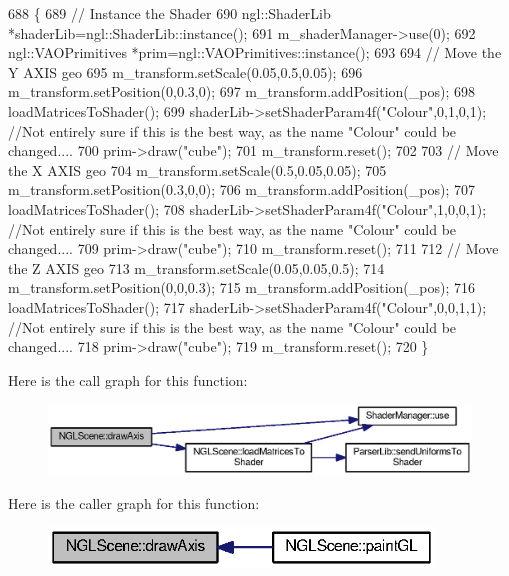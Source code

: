 \begin{DoxyCode}
688 \{
689   \textcolor{comment}{// Instance the Shader}
690   ngl::ShaderLib *shaderLib=ngl::ShaderLib::instance();
691   m_shaderManager->use(0);
692   ngl::VAOPrimitives *prim=ngl::VAOPrimitives::instance();
693 
694   \textcolor{comment}{// Move the Y AXIS geo}
695   m_transform.setScale(0.05,0.5,0.05);
696   m_transform.setPosition(0,0.3,0);
697   m_transform.addPosition(\_pos);
698   loadMatricesToShader();
699   shaderLib->setShaderParam4f(\textcolor{stringliteral}{"Colour"},0,1,0,1); \textcolor{comment}{//Not entirely sure if this is the best way, as the name
       "Colour" could be changed....}
700   prim->draw(\textcolor{stringliteral}{"cube"});
701   m_transform.reset();
702 
703   \textcolor{comment}{// Move the X AXIS geo}
704   m_transform.setScale(0.5,0.05,0.05);
705   m_transform.setPosition(0.3,0,0);
706   m_transform.addPosition(\_pos);
707   loadMatricesToShader();
708   shaderLib->setShaderParam4f(\textcolor{stringliteral}{"Colour"},1,0,0,1); \textcolor{comment}{//Not entirely sure if this is the best way, as the name
       "Colour" could be changed....}
709   prim->draw(\textcolor{stringliteral}{"cube"});
710   m_transform.reset();
711 
712   \textcolor{comment}{// Move the Z AXIS geo}
713   m_transform.setScale(0.05,0.05,0.5);
714   m_transform.setPosition(0,0,0.3);
715   m_transform.addPosition(\_pos);
716   loadMatricesToShader();
717   shaderLib->setShaderParam4f(\textcolor{stringliteral}{"Colour"},0,0,1,1); \textcolor{comment}{//Not entirely sure if this is the best way, as the name
       "Colour" could be changed....}
718   prim->draw(\textcolor{stringliteral}{"cube"});
719   m_transform.reset();
720 \}
\end{DoxyCode}


Here is the call graph for this function\-:\nopagebreak
\begin{figure}[H]
\begin{center}
\leavevmode
\includegraphics[width=350pt]{class_n_g_l_scene_a3fc824ff4a9140812b9ea473cdd9b2c5_cgraph}
\end{center}
\end{figure}




Here is the caller graph for this function\-:\nopagebreak
\begin{figure}[H]
\begin{center}
\leavevmode
\includegraphics[width=290pt]{class_n_g_l_scene_a3fc824ff4a9140812b9ea473cdd9b2c5_icgraph}
\end{center}
\end{figure}


